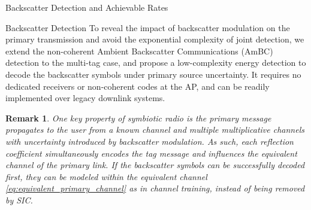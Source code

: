\documentclass[journal]{IEEEtran}
\newtheorem{remark}{Remark}
\begin{document}
\begin{section}{Backscatter Detection and Achievable Rates}
		\begin{subsection}{Backscatter Detection}
			To reveal the impact of backscatter modulation on the primary transmission and avoid the exponential complexity of joint detection, we extend the non-coherent Ambient Backscatter Communications (AmBC) detection \cite{Qian2019} to the multi-tag case, and propose a low-complexity energy detection to decode the backscatter symbols under primary source uncertainty. It requires no dedicated receivers or non-coherent codes at the AP, and can be readily implemented over legacy downlink systems.

			\begin{remark}
				One key property of symbiotic radio is the primary message propagates to the user from a known channel and multiple multiplicative channels with uncertainty introduced by backscatter modulation. As such, each reflection coefficient simultaneously encodes the tag message and influences the equivalent channel of the primary link. If the backscatter symbols can be successfully decoded first, they can be modeled within the equivalent channel \eqref{eq:equivalent_primary_channel} as in channel training, instead of being removed by SIC.
			\end{remark}


\end{subsection}
\end{section}
\end{document}
